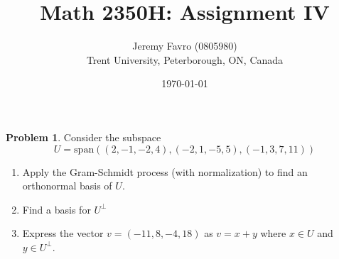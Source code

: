 \documentclass[10pt]{article}
\title{Math 2350H: Assignment IV}
\author{Jeremy Favro (0805980) \\ Trent University, Peterborough, ON, Canada}
\date{\today}
\theoremstyle{definition}
\newtheorem{problem}{Problem}
\begin{document}
\maketitle

\begin{problem}
Consider the subspace
$$U=\mathrm{span}\left(
  \left(2,-1,-2,4\right),
  \left(-2,1,-5,5\right),
  \left(-1,3,7,11\right)
  \right)$$
\begin{enumerate}[label=(\alph*)]
  \item Apply the Gram-Schmidt process (with normalization) to find an orthonormal basis of $U$.
  \item Find a basis for $U^\perp$
  \item Express the vector $v = (-11, 8, -4, 18)$ as $v = x + y$ where
        $x\in U$ and $y \in U^\perp$.
\end{enumerate}
\end{problem}
\end{document}
